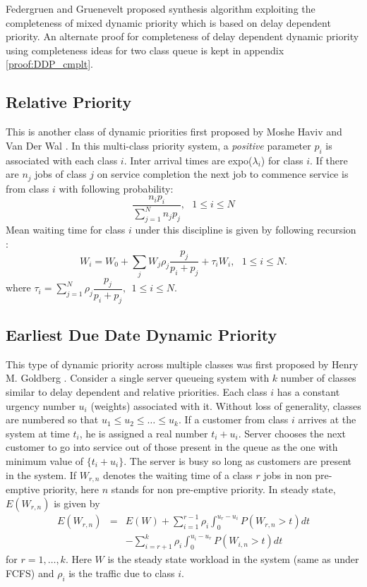\documentclass[a4paper,12pt]{article}
\begin{document}
Federgruen and Gruenevelt \cite{federgruen} proposed synthesis algorithm exploiting the completeness of mixed dynamic priority which is based on delay dependent priority. An alternate proof for completeness of delay dependent dynamic priority using completeness ideas for two class queue is kept in appendix \ref{proof:DDP_cmplt}.

\subsection{Relative Priority}
This is another class of dynamic priorities first proposed by Moshe Haviv and Van Der Wal \cite{haviv2}. In this multi-class priority system, a \textit{positive} parameter $p_i$ is associated with each class $i$. Inter arrival times are  expo($\lambda_i$) for class $i$. If there are $n_j$ jobs of class $j$ on service completion the next job to commence service is from class $i$ with following probability:
\begin{equation}
\dfrac{n_i p_i}{\sum_{j=1}^N n_j p_j}, ~~~1 \leq i \leq N
\end{equation}
 Mean waiting time for class $i$ under this discipline is given by following recursion \cite{haviv2}:
\begin{equation}
W_i = W_0 + \sum_{j}W_j \rho_j\dfrac{p_j}{p_i + p_j} + \tau_i W_i,~~~1\leq i\leq N.
\end{equation}  
  where $\tau_i = \displaystyle \sum_{j = 1}^N\rho_j\dfrac{p_j}{p_i + p_j},~~1 \leq i \leq N $. 
\subsection{Earliest Due Date Dynamic Priority}  
  This type of dynamic priority across multiple classes was first proposed by Henry M. Goldberg \cite{EDDpriority}. Consider a single server queueing system with $k$ number of classes similar to delay dependent and relative priorities. Each class $i$ has a constant urgency number $u_i$ (weights) associated with it. Without loss of generality, classes are numbered so that $u_1 \leq u_2 \leq \dots \leq u_k$. If a customer from class $i$ arrives at the system at time $t_i$, he is assigned a real number $t_i + u_i$. Server chooses the next customer to go into service out of those present in the queue as the one with minimum value of $\{t_i + u_i\}$. The server is busy so long as customers are present in the system. If $W_{r,n}$ denotes the waiting time of a class $r$ jobs in non pre-emptive priority, here $n$ stands for non pre-emptive priority. In steady state, $E(W_{r,n})$ is given by \cite{EDDpriority}
  \begin{eqnarray}\nonumber
  E(W_{r,n}) &=& E(W) + \sum_{i=1}^{r-1}\rho_i\int_{0}^{u_r-u_i}P(W_{r,n} > t)dt \\\label{eqn:EDD_recursion}
 & & - \sum_{i=r+1}^{k}\rho_i\int_{0}^{u_i-u_r}P(W_{i,n} > t)dt 
  \end{eqnarray}
for $r = 1, \dots, k$. Here $W$ is the steady state workload in the system (same as under FCFS) and $\rho_i$ is the traffic due to class $i$. 
\end{document}

